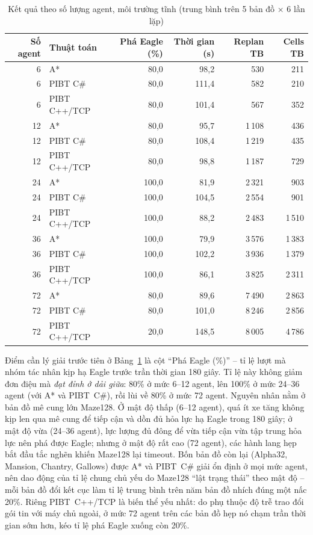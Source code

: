 \documentclass[../DoAn.tex]{subfiles}
\begin{document}
\begin{table}[htbp]
\centering
\caption{Kết quả theo số lượng agent, môi trường tĩnh (trung bình trên 5 bản đồ \(\times\) 6 lần lặp)}
\label{tab:scaling_results}
\small
\setlength{\tabcolsep}{5pt}
\begin{tabular}{|r|l|r|r|r|r|}
\hline
\textbf{Số agent} & \textbf{Thuật toán} & \textbf{Phá Eagle (\%)} & \textbf{Thời gian (s)} & \textbf{Replan TB} & \textbf{Cells TB} \\ \hline
 6 & A*           & 80,0 & 98,2 & 530 & 211 \\
 6 & PIBT C\#     & 80,0 & 111,4 & 582 & 210 \\
 6 & PIBT C++/TCP & 80,0 & 101,4 & 567 & 352 \\
\hline
12 & A*           & 80,0 & 95,7 & 1\,108 & 436 \\
12 & PIBT C\#     & 80,0 & 108,4 & 1\,219 & 435 \\
12 & PIBT C++/TCP & 80,0 & 98,8 & 1\,187 & 729 \\
\hline
24 & A*           & 100,0 & 81,9 & 2\,321 & 903 \\
24 & PIBT C\#     & 100,0 & 104,5 & 2\,554 & 901 \\
24 & PIBT C++/TCP & 100,0 & 88,2 & 2\,483 & 1\,510 \\
\hline
36 & A*           & 100,0 & 79,9 & 3\,576 & 1\,383 \\
36 & PIBT C\#     & 100,0 & 102,2 & 3\,936 & 1\,379 \\
36 & PIBT C++/TCP & 100,0 & 86,1 & 3\,825 & 2\,311 \\
\hline
72 & A*           & 80,0 & 89,6 & 7\,490 & 2\,863 \\
72 & PIBT C\#     & 80,0 & 101,0 & 8\,246 & 2\,856 \\
72 & PIBT C++/TCP & 20,0 & 148,5 & 8\,005 & 4\,786 \\
\hline
\end{tabular}
\end{table}

Điểm cần lý giải trước tiên ở Bảng~\ref{tab:scaling_results} là cột ``Phá Eagle (\%)'' -- tỉ lệ
lượt mà nhóm tác nhân kịp hạ Eagle trước trần thời gian 180 giây. Tỉ lệ này không giảm đơn điệu mà
\emph{đạt đỉnh ở dải giữa}: 80\% ở mức 6--12 agent, lên 100\% ở mức 24--36 agent (với A* và
PIBT~C\#), rồi lùi về 80\% ở mức 72 agent. Nguyên nhân nằm ở bản đồ mê cung lớn Maze128. Ở mật độ
thấp (6--12 agent), quá ít xe tăng không kịp len qua mê cung để tiếp cận và dồn đủ hỏa lực hạ Eagle
trong 180 giây; ở mật độ vừa (24--36 agent), lực lượng đủ đông để vừa tiếp cận vừa tập trung hỏa
lực nên phá được Eagle; nhưng ở mật độ rất cao (72 agent), các hành lang hẹp bắt đầu tắc nghẽn
khiến Maze128 lại timeout. Bốn bản đồ còn lại (Alpha32, Mansion, Chantry, Gallows) được A* và
PIBT~C\# giải ổn định ở mọi mức agent, nên dao động của tỉ lệ chung chủ yếu do Maze128 ``lật trạng
thái'' theo mật độ -- mỗi bản đồ đổi kết cục làm tỉ lệ trung bình trên năm bản đồ nhích đúng một
nấc 20\%. Riêng PIBT~C++/TCP là biến thể yếu nhất: do phụ thuộc độ trễ trao đổi gói tin với máy chủ
ngoài, ở mức 72 agent trên các bản đồ hẹp nó chạm trần thời gian sớm hơn, kéo tỉ lệ phá Eagle xuống
còn 20\%.
\end{document}
